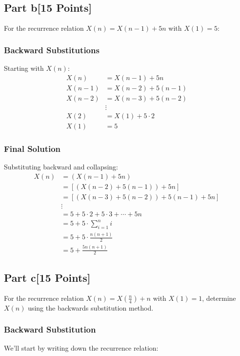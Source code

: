 \documentclass[12pt]{article}
\begin{document}
\subsection*{Part b[15 Points]}
For the recurrence relation \( X(n) = X(n-1) + 5n \) with \( X(1) = 5 \):

\subsubsection*{Backward Substitutions}
Starting with \(X(n)\):
\begin{align*}
X(n) &= X(n-1) + 5n \\
X(n-1) &= X(n-2) + 5(n-1) \\
X(n-2) &= X(n-3) + 5(n-2) \\
&\vdots \\
X(2) &= X(1) + 5 \cdot 2 \\
X(1) &= 5
\end{align*}

\subsubsection*{Final Solution}
Substituting backward and collapsing:
\begin{align*}
X(n) &= (X(n-1) + 5n) \\
&= [(X(n-2) + 5(n-1)) + 5n] \\
&= [(X(n-3) + 5(n-2)) + 5(n-1) + 5n] \\
&\vdots \\
&= 5 + 5 \cdot 2 + 5 \cdot 3 + \cdots + 5n \\
&= 5 + 5 \cdot \sum_{i=1}^{n} i \\
&= 5 + 5 \cdot \frac{n(n + 1)}{2} \\
&= 5 + \frac{5n(n + 1)}{2}
\end{align*}

\subsection*{Part c[15 Points]}
For the recurrence relation \( X(n) = X\left(\frac{n}{4}\right) + n \) with \( X(1) = 1 \), determine \( X(n) \) using the backwards substitution method.

\subsubsection*{Backward Substitution}
We'll start by writing down the recurrence relation:
\end{document}
